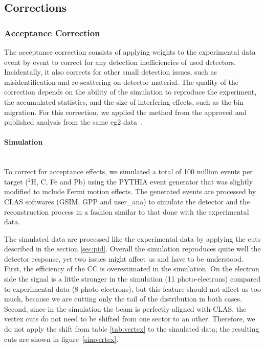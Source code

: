 \subsection{Corrections}
\label{sec:corrections}

\subsubsection{Acceptance Correction}
\label{sec:accept}

The acceptance correction consists of applying weights to the experimental data
event by event to correct for any detection inefficiencies of used detectors.
Incidentally, it also corrects for other small detection issues, such as 
misidentification and re-scattering on detector material. The quality 
of the correction depends on the ability of the simulation to reproduce the 
experiment, the accumulated statistics, and the size of interfering effects, such 
as the bin migration. For this correction, we applied the method from the 
approved and published analysis from the same eg2 data~\cite{ElFassi:2008}.

\paragraph{Simulation} ~\\
To correct for acceptance effects, we simulated a total of 100 million events 
per target ($^2$H, C, Fe and Pb) using the PYTHIA \cite{Sjostrand:2006za} 
event generator that was slightly modified to include Fermi motion effects. The 
generated events are processed by CLAS softwares (GSIM, GPP and user\_ana) 
to simulate the detector and the reconstruction process in a fashion similar 
to that done with the experimental data.

The simulated data are processed like the experimental data by 
applying the cuts described in the section \ref{sec:pid}. Overall the 
simulation reproduces quite well the detector response, yet two issues might 
affect us and have to be understood. First, the efficiency of the CC is 
overestimated in the simulation. On the electron side the signal is a little stronger in the simulation (11 
photo-electrons) compared to experimental data (8 photo-electrons), but this 
feature should not affect us too much, because we are cutting only the tail of the 
distribution in both cases. Second, since in the simulation the beam is perfectly aligned with CLAS, the vertex cuts do not need to be shifted from one sector to an other. Therefore, we do not apply the shift from table \ref{tab:vertex} to the simulated data; the resulting cuts are shown in figure~\ref{simvertex}.

